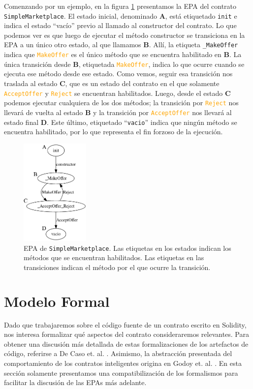 Comenzando por un ejemplo, en la figura \ref{fig:epa-example} presentamos la EPA del contrato \texttt{Simple\-Marketplace}.
El estado inicial, denominado \textbf{A}, está etiquetado \texttt{init} e indica el estado ``vacío'' previo al llamado al constructor del contrato.
Lo que podemos ver es que luego de ejecutar el método constructor se transiciona en la EPA a un único otro estado, al que llamamos \textbf{B}.
Allí, la etiqueta \texttt{\_MakeOffer} indica que \textcolor{orange}{\texttt{MakeOffer}} es el único método que se encuentra habilitado en \textbf{B}.
La única transición desde \textbf{B}, etiquetada \textcolor{orange}{\texttt{MakeOffer}}, indica lo que ocurre cuando se ejecuta ese método desde ese estado. Como vemos, seguir esa transición nos traslada  al estado \textbf{C}, que es un estado del contrato en el que solamente \textcolor{orange}{\texttt{AcceptOffer}} y \textcolor{orange}{\texttt{Reject}} se encuentran habilitados.
Luego, desde el estado \textbf{C} podemos ejecutar cualquiera de los dos métodos; la transición por \textcolor{orange}{\texttt{Reject}} nos llevará de vuelta al estado \textbf{B} y la transición por \textcolor{orange}{\texttt{AcceptOffer}} nos llevará al estado final \textbf{D}.
Este último, etiquetado ``\texttt{vacio}'' indica que ningún método se encuentra habilitado, por lo que representa el fin forzoso de la ejecución.



\begin{figure}
    \includegraphics[width=0.3\textwidth]{figs/simple-merketplace-epa.png}
    \caption{EPA de \texttt{SimpleMarketplace}. Las etiquetas en los estados indican los métodos que se encuentran habilitados. Las etiquetas en las transiciones indican el método por el que ocurre la transición.}
    \label{fig:epa-example}
\end{figure}

\section{Modelo Formal}
Dado que trabajaremos sobre el código fuente de un contrato escrito en Solidity, nos interesa formalizar qué aspectos del contrato consideraremos relevantes.
Para obtener una discusión más detallada de estas formalizaciones de los artefactos de código, referirse a De Caso et. al.  \cite{de-caso-epa}.
Asimismo, la abstracción presentada del comportamiento de los contratos inteligentes origina en Godoy et. al. \cite{predicate-abstraction-for-smart-contract-validation}.
En esta sección solamente presentamos una compatibilización de los formalismos para facilitar la discusión de las EPAs más adelante.

